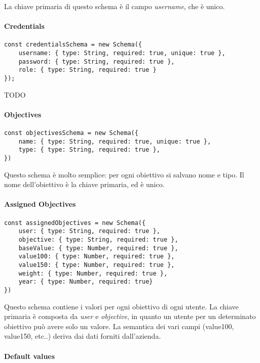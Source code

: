La chiave primaria di questo schema è il campo \textit{username}, che è unico.

\paragraph{Credentials}

\begin{verbatim}
const credentialsSchema = new Schema({
    username: { type: String, required: true, unique: true },
    password: { type: String, required: true },
    role: { type: String, required: true }
});
\end{verbatim}

TODO

\paragraph{Objectives}

\begin{verbatim}
const objectivesSchema = new Schema({
    name: { type: String, required: true, unique: true },
    type: { type: String, required: true },
})
\end{verbatim}

Questo schema è molto semplice: per ogni obiettivo si salvano nome e tipo. Il nome dell'obiettivo è la 
chiave primaria, ed è unico.

\paragraph{Assigned Objectives}

\begin{verbatim}
const assignedObjectives = new Schema({
    user: { type: String, required: true },
    objective: { type: String, required: true },
    baseValue: { type: Number, required: true },
    value100: { type: Number, required: true },
    value150: { type: Number, required: true },
    weight: { type: Number, required: true },
    year: { type: Number, required: true}
})
\end{verbatim}

Questo schema contiene i valori per ogni obiettivo di ogni utente.
La chiave primaria è composta da \textit{user} e \textit{objective}, in quanto un utente per un determinato 
obiettivo può avere solo un valore. La semantica dei vari campi (value100, value150, etc..) deriva dai dati
forniti dall'azienda.

\paragraph{Default values}

